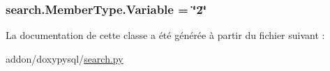 \subsubsection[{Variable}]{ search.\+Member\+Type.\+Variable = \char`\"{}2\char`\"{}\hspace{0.3cm}{\ttfamily [static]}}\label{classsearch_1_1_member_type_a1e9433d973bbf07cfc858ed42ad52bd8}


La documentation de cette classe a été générée à partir du fichier suivant \+:\begin{DoxyCompactItemize}
\item 
addon/doxypysql/\hyperlink{search_8py}{search.\+py}\end{DoxyCompactItemize}
